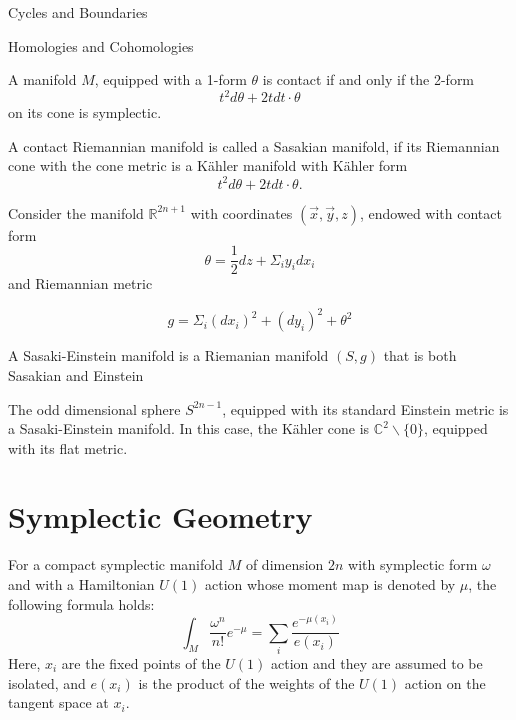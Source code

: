 \begin{subsubsection}{Cycles and Boundaries}
\begin{subsubsection}{Homologies and Cohomologies}
\begin{definition}
\begin{definition}
\begin{definition}
A manifold $M$, equipped with a 1-form $\theta$ is contact if and only if the 2-form
\begin{equation}
t^2d\theta + 2tdt\cdot\theta
\end{equation}
on its cone is symplectic.
\end{definition}

\begin{definition}
A contact Riemannian manifold is called a Sasakian manifold, if its Riemannian cone with the cone metric is a K\"ahler manifold with K\"ahler form
\begin{equation}
t^2d\theta + 2t dt\cdot \theta .
\end{equation}
\end{definition}

\begin{example}
Consider the manifold $\mathbb{R}^{2n+1}$ with coordinates $(\vec{x},\vec{y},z)$, endowed with contact form 
\begin{equation}
\theta = \frac{1}{2}dz + \Sigma_i{y_idx_i}
\end{equation}
and Riemannian metric

\begin{equation}
g = \Sigma_i{(dx_i)^2 + (dy_i)^2 + \theta^2}
\end{equation}
\end{example}

\begin{definition}
A Sasaki-Einstein manifold is a Riemanian manifold $(S,g)$ that is both Sasakian and Einstein
\end{definition}

\begin{example}
The odd dimensional sphere $S^{2n-1}$, equipped with its standard Einstein metric is a Sasaki-Einstein manifold. In this case, the K\"ahler cone is $\mathbb{C}^2\backslash\{0\}$, equipped with its flat metric.
\end{example}

\section{Symplectic Geometry}
\begin{theorem}
For a compact symplectic manifold $M$ of dimension $2n$ with symplectic form $\omega$ and with a Hamiltonian $U(1)$ action whose moment map is denoted by $\mu$, the following formula holds:
\begin{equation}
\int_M{\frac{\omega^n}{n!}e^{-\mu}} = \sum_i{\frac{e^{-\mu(x_i)}}{e(x_i)}}
\end{equation}
Here, $x_i$ are the fixed points of the $U(1)$ action and they are assumed to be isolated, and $e(x_i)$ is the product of the weights of the $U(1)$ action on the tangent space at $x_i$.


\end{theorem}
\end{definition}
\end{definition}
\end{subsubsection}
\end{subsubsection}
